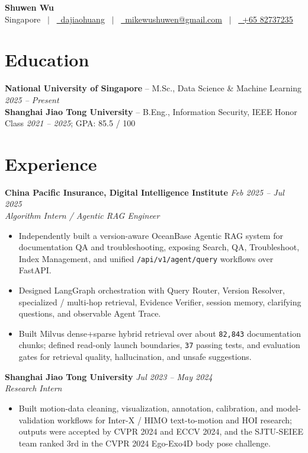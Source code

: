 \documentclass[a4paper,10pt]{extarticle}
\newcommand{\entry}[3]{%
  \textbf{#1} \hfill \textit{#2}\\[-1pt]
  \textit{#3}
}
\begin{document}
\pagestyle{empty}

\begin{center}
  {\LARGE\bfseries Shuwen Wu} \\[3pt]
  {\small Singapore \ $|$ \
  \href{https://github.com/dajiaohuang}{\faGithub\ dajiaohuang} \ $|$ \
  \href{mailto:mikewushuwen@gmail.com}{\faEnvelope\ mikewushuwen@gmail.com} \ $|$ \
  \href{tel:+65 82737235}{\faMobile\ +65 82737235}}
\end{center}

\section{Education}
\textbf{National University of Singapore} -- M.Sc., Data Science \& Machine Learning \hfill \textit{2025 -- Present}\\
\textbf{Shanghai Jiao Tong University} -- B.Eng., Information Security, IEEE Honor Class \hfill \textit{2021 -- 2025}; GPA: 85.5 / 100

\section{Experience}
\entry{China Pacific Insurance, Digital Intelligence Institute}{Feb 2025 -- Jul 2025}{Algorithm Intern / Agentic RAG Engineer}
\vspace{-0.7em}
{\small
\begin{itemize}
  \item Independently built a version-aware OceanBase Agentic RAG system for documentation QA and troubleshooting, exposing Search, QA, Troubleshoot, Index Management, and unified \texttt{/api/v1/agent/query} workflows over FastAPI.
  \item Designed LangGraph orchestration with Query Router, Version Resolver, specialized / multi-hop retrieval, Evidence Verifier, session memory, clarifying questions, and observable Agent Trace.
  \item Built Milvus dense+sparse hybrid retrieval over about \texttt{82,843} documentation chunks; defined read-only launch boundaries, \texttt{37} passing tests, and evaluation gates for retrieval quality, hallucination, and unsafe suggestions.
\end{itemize}
}

\entry{Shanghai Jiao Tong University}{Jul 2023 -- May 2024}{Research Intern}
\vspace{-0.7em}
{\small
\begin{itemize}
  \item Built motion-data cleaning, visualization, annotation, calibration, and model-validation workflows for Inter-X / HIMO text-to-motion and HOI research; outputs were accepted by CVPR 2024 and ECCV 2024, and the SJTU-SEIEE team ranked 3rd in the CVPR 2024 Ego-Exo4D body pose challenge.
\end{itemize}
}
\end{document}
